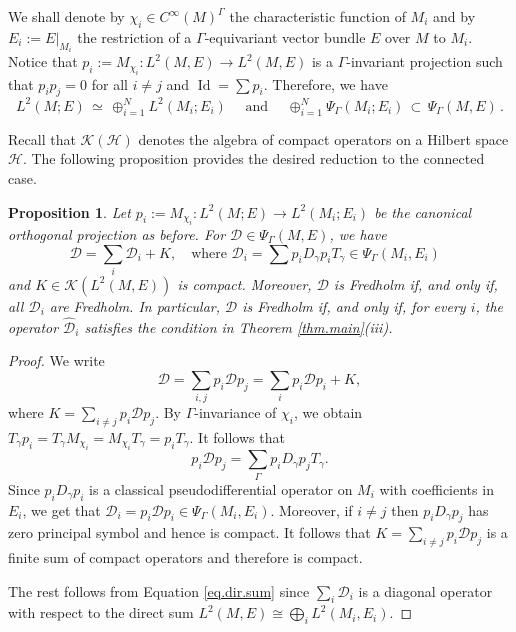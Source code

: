 \documentclass[11pt,a4paper]{amsart}
\newcommand{\maD}{\mathcal D}
\newcommand{\maH}{\mathcal H}
\newcommand{\maK}{\mathcal K}
\newcommand\<{\langle}
\renewcommand\>{\rangle}
\newcommand{\oid}{\operatorname{Id}}
\newtheorem{proposition}[theorem]{Proposition}
\theoremstyle{definition}
\begin{document}
We shall denote by $\chi_i \in C^\infty(M)^\Gamma$ the characteristic function of $M_i$ and
by $E_i := E\vert_{M_i}$ the restriction of a $\Gamma$-equivariant vector bundle $E$ over $M$ to $M_i$. 
Notice that $p_i:=M_{\chi_i} : L^2(M,E) \rightarrow L^2(M,E)$ is a $\Gamma$-invariant projection
such that $p_ip_j=0$ for all $i\neq j$ and $\oid = \sum p_i$.
Therefore, we have 
\begin{equation}\label{eq.dir.sum}
  L^2(M; E) \, \simeq \, \oplus_{i=1}^N L^2(M_i; E_i) \quad \mbox{ and
  } \quad
%
  \oplus_{i=1}^N \Psi_\Gamma(M_i; E_i) \, \subset \, \Psi_\Gamma(M,E)\,.
\end{equation}

Recall that $\maK(\maH)$ denotes the algebra of compact operators on a
Hilbert space $\maH$. The following proposition provides the desired
reduction to the connected case.

\begin{proposition}\label{prop.reduction}
Let $p_i:= M_{\chi_i} : L^2(M; E) \to L^2(M_i; E_i)$ be the canonical orthogonal
projection as before. For $\maD \in \Psi_\Gamma(M,E)$, we have
\begin{equation*}
\maD = \sum_{i} \maD_i + K,\quad\text{where $\maD_i = \sum p_i D_\gamma p_i T_\gamma \in \Psi_\Gamma(M_i,E_i)$ }
\end{equation*}
and $K \in \maK(L^2(M,E))$ is compact.
Moreover, $\maD$ is Fredholm if, and only if, all $\maD_i$ are Fredholm.
In particular, $\maD$ is Fredholm if, and only if, for every $i$, the operator $\hat{\maD}_i$ satisfies the condition in Theorem \ref{thm.main}(iii).
\end{proposition}

\begin{proof}
We write
\begin{equation*}
\maD = \sum_{i,j} p_i \maD p_j =\sum_i p_i \maD p_i + K ,
\end{equation*}
where $K=\sum_{i\neq j} p_i \maD p_j$. 
By $\Gamma$-invariance of $\chi_i$, 
we obtain $T_\gamma p_i =T_\gamma M_{\chi_i} = M_{\chi_i} T_\gamma = p_i T_\gamma$.
It follows that
\begin{equation*}
p_i \maD p_j = \sum_\Gamma p_iD_\gamma p_j T_\gamma.
\end{equation*} 
Since $p_i D_\gamma p_i$ is a classical 
pseudodifferential operator on $M_i$ with coefficients in $E_i$,
we get that $\maD_i=p_i\maD p_i \in \Psi_\Gamma(M_i,E_i)$.
Moreover, if $i \neq j$ then $p_i D_\gamma p_j$ has zero principal symbol and hence is compact.
It follows that $K=\sum_{i\neq j} p_i \maD p_j$ is a finite sum of compact operators
and therefore is compact. 

The rest follows from Equation \eqref{eq.dir.sum} 
since $\sum_i \maD_i$ is a diagonal operator with respect to the direct sum 
$L^2(M,E) \cong \bigoplus_i L^2(M_i,E_i)$. 
\end{proof}
\end{document}
